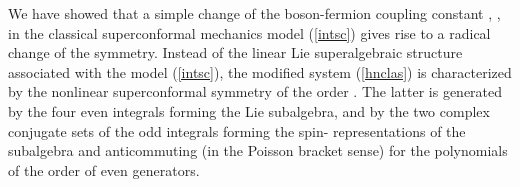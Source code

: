 \documentclass[a4paper,12pt]{article}
\def\N{\mathbb N}
\begin{document}
We have showed that a simple change
of the boson-fermion coupling
constant
\coordHE{},
\myHighlight{$n\in \N$}\coordHE{}, in  the
classical superconformal mechanics
model (\ref{intsc})
gives rise to a radical change of the symmetry.
Instead of the linear Lie superalgebraic \coordHE{}
structure associated with the model
(\ref{intsc}), the modified system
(\ref{hnclas}) is characterized by
the nonlinear superconformal symmetry of
the order \coordHE{}.
The latter is generated
by the four even integrals forming the
\coordHE{} Lie subalgebra,
and by the two complex conjugate
sets of the \coordHE{} odd integrals forming the
spin-\coordHE{}
representations of the \coordHE{} subalgebra and
anticommuting (in the Poisson bracket sense)
for the polynomials of the order \coordHE{} of even generators.
\end{document}
